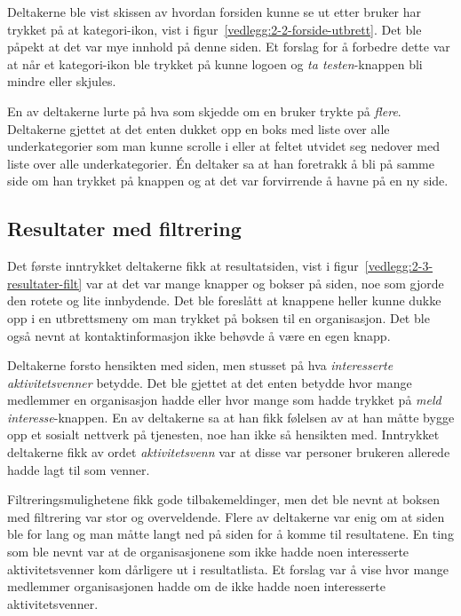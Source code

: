 Deltakerne ble vist skissen av hvordan forsiden kunne se ut etter bruker har trykket på at kategori-ikon, vist i figur~\ref{vedlegg:2-2-forside-utbrett}. Det ble påpekt at det var mye innhold på denne siden. Et forslag for å forbedre dette var at når et kategori-ikon ble trykket på kunne logoen og {\em  ta testen}-knappen bli mindre eller skjules. 

En av deltakerne lurte på hva som skjedde om en bruker trykte på {\em  flere}. Deltakerne gjettet at det enten dukket opp en boks med liste over alle underkategorier som man kunne scrolle i eller at feltet utvidet seg nedover med liste over alle underkategorier. Én deltaker sa at han foretrakk å bli på samme side om han trykket på knappen og at det var forvirrende å havne på en ny side.


\subsection{Resultater med filtrering}
\label{section:test-resultater-2.0}

Det første inntrykket deltakerne fikk at resultatsiden, vist i figur~\ref{vedlegg:2-3-resultater-filt} var at det var mange knapper og bokser på siden, noe som gjorde den rotete og lite innbydende. Det ble foreslått at knappene heller kunne dukke opp i en utbrettsmeny om man trykket på boksen til en organisasjon. Det ble også nevnt at kontaktinformasjon ikke behøvde å være en egen knapp.

Deltakerne forsto hensikten med siden, men stusset på hva {\em  interesserte aktivitetsvenner} betydde. Det ble gjettet at det enten betydde hvor mange medlemmer en organisasjon hadde eller hvor mange som hadde trykket på {\em  meld interesse}-knappen. En av deltakerne sa at han fikk følelsen av at han måtte bygge opp et sosialt nettverk på tjenesten, noe han ikke så hensikten med. Inntrykket deltakerne fikk av ordet {\em  aktivitetsvenn} var at disse var personer brukeren allerede hadde lagt til som venner.

Filtreringsmulighetene fikk gode tilbakemeldinger, men det ble nevnt at boksen med filtrering var stor og overveldende. Flere av deltakerne var enig om at siden ble for lang og man måtte langt ned på siden for å komme til resultatene. En ting som ble nevnt var at de organisasjonene som ikke hadde noen interesserte aktivitetsvenner kom dårligere ut i resultatlista. Et forslag var å vise hvor mange medlemmer organisasjonen hadde om de ikke hadde noen interesserte aktivitetsvenner.

